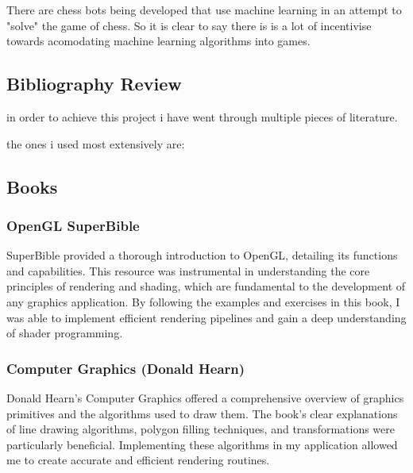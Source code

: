             There are chess bots being developed that use machine learning in an attempt to "solve" the game of chess. So it is clear to say there is is a lot of incentivise towards acomodating machine learning algorithms into games.

        \subsection{Bibliography Review}
            in order to achieve this project i have went through multiple pieces of literature.

            the ones i used most extensively are:
                \subsection{Books}
                    \subsubsection{OpenGL SuperBible}
                        SuperBible provided a thorough introduction to OpenGL,
                        detailing its functions and capabilities. This resource
                        was instrumental in understanding the core principles of
                        rendering and shading, which are fundamental to the
                        development of any graphics application. By following
                        the examples and exercises in this book, I was able to
                        implement efficient rendering pipelines and gain a deep
                        understanding of shader programming.
                    \subsubsection{Computer Graphics (Donald Hearn)}
                        Donald Hearn's Computer Graphics offered a comprehensive overview of graphics
                        primitives and the algorithms used to draw them. The book's clear explanations
                        of line drawing algorithms, polygon filling techniques, and transformations were
                        particularly beneficial. Implementing these algorithms in my application allowed
                        me to create accurate and efficient rendering routines.
